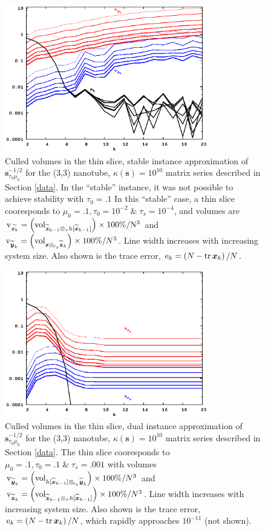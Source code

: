 \documentclass[letterpaper,twocolumn,amsmath,amsfont,amssymb,english,aps,jcp,preprintnumbers,groupaddress,nofootinbib,tightenlines,floatfix]{revtex4}
\newcommand{\mat}[1]{\boldsymbol{#1}}
\newcommand{\ot}{  {\scriptstyle \otimes}_{ \tau } }
\newcommand{\ots}{ {\scriptstyle \otimes}_{ \! \tau_s } }
\theoremstyle{plain}
\theoremstyle{remark}
\theoremstyle{plain}
\begin{document}
\begin{figure}[h]\label{regularized_stab}
 \includegraphics[width=3.5in]{fig_33_tube_cond_10_regularized/33_tube_k10_regularized_stab.eps}
\caption{
Culled volumes in the thin slice, stable instance approximation of $\mat{s}^{-1/2}_{\tau_0 \mu_0}$
for the (3,3) nanotube, $\kappa(\mat{s})=10^{10}$ matrix series 
described in Section \ref{data}.  In the ``stable'' instance, it was not possible to achieve stability with $\tau_0=.1$
In this ``stable'' case, a thin slice cooresponds to $\mu_0=.1, \tau_0=10^{-2} \;  \&  \; \tau_s=10^{-4}$, and volumes are
$\rm v_{\widetilde{\mat{z}_k}} = \left( {\rm vol}_{ \widetilde{\mat{z}}_{k-1}\ot h[\widetilde{\mat{x}}_{k-1}] } \right) \times 100\% /N^3$ and
${\rm v}_{\widetilde{\mat{y}}_k} = \left( {\rm vol}_{\mat{s}  \ots  \widetilde{\mat{z}}_{k}} \right) \times 100\% /N^3$.    
Line width increases with increasing system size. 
Also shown is the trace error, ${\rm e}_{k} = \left( N-{\rm tr}\,\mat{x}_k \right)/N$.}
\end{figure} 
\begin{figure}[h]\label{regularized_dual}
 \includegraphics[width=3.5in]{fig_33_tube_cond_10_regularized/33_tube_k10_regularized_dual.eps}
\caption{
Culled volumes in the thin slice, dual instance approximation of $\mat{s}^{-1/2}_{\tau_0 \mu_0}$
for the (3,3) nanotube, $\kappa(\mat{s})=10^{10}$ matrix series 
described in Section \ref{data}. The thin slice cooresponds to $\mu_0=.1, \tau_0=.1 \;  \&  \; \tau_s=.001$ 
with volumes 
${\rm v}_{\widetilde{\mat{y}}_k}= \left( {\rm vol}_{  h[\widetilde{\mat{x}}_{k-1}] \ots \widetilde{\mat{y}}_k }  \right) \times 100\% /N^3$ and  
${\rm v}_{\widetilde{\mat{z}}_k}= \left( {\rm vol}_{\widetilde{\mat{z}}_{k-1} \ot  h[\widetilde{\mat{x}}_{k-1}]} \right) \times 100\% /N^3$.
Line width increases with increasing system size. 
Also shown is the trace error, ${\rm e}_{k} = \left( N-{\rm tr}\,\mat{x}_k \right)/N$, which rapidly approaches $10^{-11}$ (not shown). }
\end{figure} 
\end{document}
